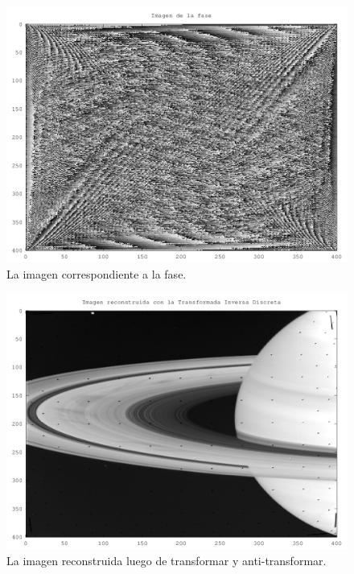 \documentclass[twocolumn,a4paper,10pt]{article}
\begin{document}
\begin{figure}[H]
        \includegraphics[width=\linewidth]{../images/phase.png}
        \caption{La imagen correspondiente a la fase.}
        \label{fig:phase}
\end{figure}

\begin{figure}[H]
        \includegraphics[width=\linewidth]{../images/rebuild.png}
        \caption{La imagen reconstruida luego de transformar y anti-transformar.}
        \label{fig:rebuild}
\end{figure}
\end{document}
